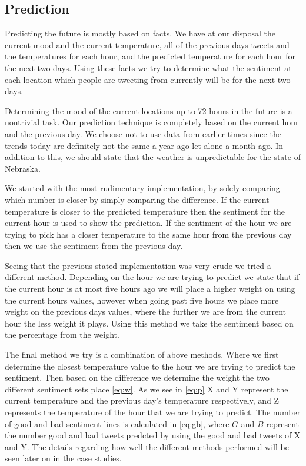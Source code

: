 \documentclass[journal]{vgtc}                %
\begin{document}
\newpage


\subsection{Prediction}
Predicting the future is mostly based on facts. We have at our disposal the current mood and the current temperature, all of the previous days tweets and the temperatures for each hour, and the predicted temperature for each hour for the next two days. Using these facts we try to determine what the sentiment at each location which people are tweeting from currently will be for the next two days. 

Determining the mood of the current locations up to 72 hours in the future is a nontrivial task. Our prediction technique is completely based on the current hour and the previous day. We choose not to use data from earlier times since the trends today are definitely not the same a year ago let alone a month ago. In addition to this, we should state that the weather is unpredictable for the state of Nebraska.

We started with the most rudimentary implementation, by solely comparing which number is closer by simply comparing the difference. If the current temperature is closer to the predicted temperature then the sentiment for the current hour is used to show the prediction. If the sentiment of the hour we are trying to pick has a closer temperature to the same hour from the previous day then we use the sentiment from the previous day. 

Seeing that the previous stated implementation was very crude we tried a different method. Depending on the hour we are trying to predict we state that if the current hour is at most five hours ago we will place a higher weight on using the current hours values, however when going past five hours we place more weight on the previous days values, where the further we are from the current hour the less weight it plays. Using this method we take the sentiment based on the percentage from the weight.

The final method we try is a combination of above methods. Where we first determine the closest temperature value to the hour we are trying to predict the sentiment. Then based on the difference we determine the weight the two different sentiment sets place \eqref{eq:w}. As we see in \eqref{eq:p} X and Y represent the current temperature and the previous day's temperature respectively, and Z represents the temperature of the hour that we are trying to predict. The number of good and bad sentiment lines is calculated in \eqref{eq:gb}, where $G$ and $B$ represent the number good and bad tweets predcted by using the good and bad tweets of X and Y. The details regarding how well the different methods performed will be seen later on in the case studies.\\
\end{document}
